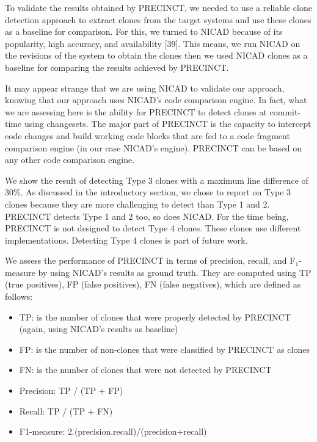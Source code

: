 \documentclass[12pt]{report}
\providecommand{\tightlist}{%
  \setlength{\itemsep}{0pt}\setlength{\parskip}{0pt}}
\begin{document}
To validate the results obtained by PRECINCT, we needed to use a
reliable clone detection approach to extract clones from the target
systems and use these clones as a baseline for comparison. For this, we
turned to NICAD because of its popularity, high accuracy, and
availability {[}39{]}. This means, we run NICAD on the revisions of the
system to obtain the clones then we used NICAD clones as a baseline for
comparing the results achieved by PRECINCT.

It may appear strange that we are using NICAD to validate our approach,
knowing that our approach uses NICAD's code comparison engine. In fact,
what we are assessing here is the ability for PRECINCT to detect clones
at commit-time using changesets. The major part of PRECINCT is the
capacity to intercept code changes and build working code blocks that
are fed to a code fragment comparison engine (in our case NICAD's
engine). PRECINCT can be based on any other code comparison engine.

We show the result of detecting Type 3 clones with a maximum line
difference of 30\%. As discussed in the introductory section, we chose
to report on Type 3 clones because they are more challenging to detect
than Type 1 and 2. PRECINCT detects Type 1 and 2 too, so does NICAD. For
the time being, PRECINCT is not designed to detect Type 4 clones. These
clones use different implementations. Detecting Type 4 clones is part of
future work.

We assess the performance of PRECINCT in terms of precision, recall, and
F\(_{1}\)-measure by using NICAD's results as ground truth. They are
computed using TP (true positives), FP (false positives), FN (false
negatives), which are defined as follows:

\begin{itemize}
\tightlist
\item
  TP: is the number of clones that were properly detected by PRECINCT
  (again, using NICAD's results as baseline)
\item
  FP: is the number of non-clones that were classified by PRECINCT as
  clones
\item
  FN: is the number of clones that were not detected by PRECINCT
\item
  Precision: TP / (TP + FP)
\item
  Recall: TP / (TP + FN)
\item
  F1-measure: 2.(precision.recall)/(precision+recall)
\end{itemize}
\end{document}
